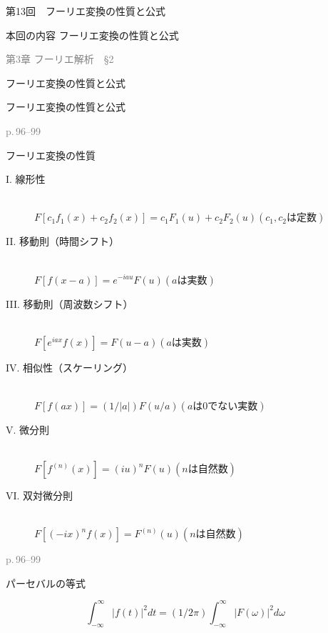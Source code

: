\documentclass[aspectratio=43,professionalfonts,handout]{beamer}
\begin{document}
\begin{frame}{第13回　フーリエ変換の性質と公式}
  \begin{block}{本回の内容}
  フーリエ変換の性質と公式
  \end{block}
  \vfill\hfill{\scriptsize \textcolor{gray}{第3章 フーリエ解析　§2}}
\end{frame}

\begin{frame}{フーリエ変換の性質と公式}
  \begin{block}{}
  {\large フーリエ変換の性質と公式}
  \end{block}
  \vfill\hfill{\scriptsize \textcolor{gray}{p.\,96--99}}
\end{frame}

\begin{frame}{フーリエ変換の性質}
  \begin{block}{}
  \begin{description}
    \item[I. 線形性]\mbox{}\\$F[c_{1}f_{1}(x) + c_{2}f_{2}(x)] = c_{1}F_{1}(u) + c_{2}F_{2}(u)  (c_{1}, c_{2} は定数)$
    \item[II. 移動則（時間シフト）]\mbox{}\\$F[f(x-a)] = e^{-iau} F(u)  (a は実数)$
    \item[III. 移動則（周波数シフト）]\mbox{}\\$F[e^{iax}f(x)] = F(u-a)  (a は実数)$
    \item[IV. 相似性（スケーリング）]\mbox{}\\$F[f(ax)] = (1/|a|) F(u/a)  (a は 0 でない実数)$
    \item[V. 微分則]\mbox{}\\$F[f^{(n)}(x)] = (iu)^n F(u)  (n は自然数)$
    \item[VI. 双対微分則]\mbox{}\\$F[(-ix)^n f(x)] = F^{(n)}(u)  (n は自然数)$
  \end{description}
  \end{block}
  \vfill\hfill{\scriptsize \textcolor{gray}{p.\,96--99}}
\end{frame}

\begin{frame}{パーセバルの等式}
  \begin{block}{}
  \[
    \int_{-\infty}^\infty |f(t)|^{2} dt = (1/2\pi) \int_{-\infty}^\infty |F(\omega)|^{2} d\omega
  \]
  \end{block}
\end{frame}
\end{document}
